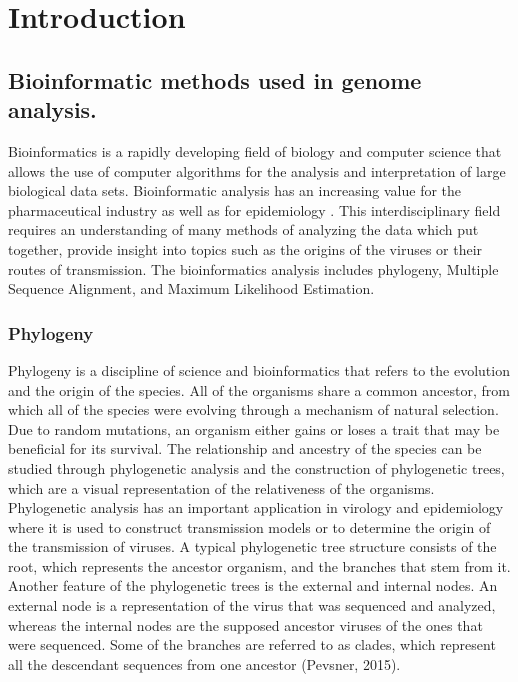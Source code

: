 \chapter{Introduction}

\section{Bioinformatic methods used in genome analysis.}

Bioinformatics is a rapidly developing field of biology and computer science that allows the use of computer algorithms for the analysis and interpretation of large biological data sets. 
Bioinformatic analysis has an increasing value for the pharmaceutical industry as well as for epidemiology \cite{holmes_1995_revealing}.
This interdisciplinary field requires an understanding of many methods of analyzing the data which  put together, provide insight into topics such as the origins of the viruses or their routes of transmission. 
The bioinformatics analysis includes phylogeny, Multiple Sequence Alignment, and Maximum Likelihood Estimation.   


    \subsection{Phylogeny}
Phylogeny is a discipline of science and bioinformatics that refers to the evolution and the origin of the species. 
All of the organisms share a common ancestor, from which all of the species were evolving through a mechanism of natural selection.
Due to random mutations, an organism either gains or loses a trait that may be beneficial for its survival. 
The relationship and ancestry of the species can be studied through phylogenetic analysis and the construction of phylogenetic trees, which are a visual representation of the relativeness of the organisms.  
Phylogenetic analysis has an important application in virology and epidemiology where it is used to construct transmission models or to determine the origin of the transmission of viruses.
A typical phylogenetic tree structure consists of the root, which represents the ancestor organism, and the branches that stem from it. 
Another feature of the phylogenetic trees is the external and internal nodes. 
An external node is a representation of the virus that was sequenced and analyzed, whereas the internal nodes are the supposed ancestor viruses of the ones that were sequenced.
Some of the branches are referred to as clades, which represent all the descendant sequences from one ancestor (Pevsner, 2015). 

